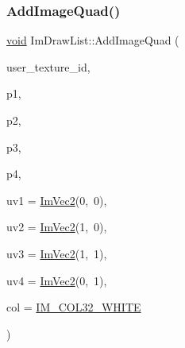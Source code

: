 \subsubsection{\texorpdfstring{Add\+Image\+Quad()}{AddImageQuad()}}
{\footnotesize\ttfamily \hyperlink{imgui__impl__opengl3__loader_8h_ac668e7cffd9e2e9cfee428b9b2f34fa7}{void} Im\+Draw\+List\+::\+Add\+Image\+Quad (\begin{DoxyParamCaption}\item[{Im\+Texture\+ID}]{user\+\_\+texture\+\_\+id,  }\item[{const \hyperlink{structImVec2}{Im\+Vec2} \&}]{p1,  }\item[{const \hyperlink{structImVec2}{Im\+Vec2} \&}]{p2,  }\item[{const \hyperlink{structImVec2}{Im\+Vec2} \&}]{p3,  }\item[{const \hyperlink{structImVec2}{Im\+Vec2} \&}]{p4,  }\item[{const \hyperlink{structImVec2}{Im\+Vec2} \&}]{uv1 = {\ttfamily \hyperlink{structImVec2}{Im\+Vec2}(0,~0)},  }\item[{const \hyperlink{structImVec2}{Im\+Vec2} \&}]{uv2 = {\ttfamily \hyperlink{structImVec2}{Im\+Vec2}(1,~0)},  }\item[{const \hyperlink{structImVec2}{Im\+Vec2} \&}]{uv3 = {\ttfamily \hyperlink{structImVec2}{Im\+Vec2}(1,~1)},  }\item[{const \hyperlink{structImVec2}{Im\+Vec2} \&}]{uv4 = {\ttfamily \hyperlink{structImVec2}{Im\+Vec2}(0,~1)},  }\item[{Im\+U32}]{col = {\ttfamily \hyperlink{imgui_8h_a08fc9855cd3e3fcbb7fcd93b38bd7057}{I\+M\+\_\+\+C\+O\+L32\+\_\+\+W\+H\+I\+TE}} }\end{DoxyParamCaption})}

\mbox{\label{structImDrawList_a864ccce7a012e9c1ffb4d5693311d847}} 
